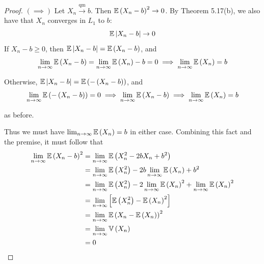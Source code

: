 \documentclass[a4paper]{article}
\begin{document}
\newpage

\begin{proof}[Proof] 
\(\left( \implies \right)\)  Let \(X_{n} \xrightarrow{\text{qm}} b\). Then \(\mathbb{E}\left( X_{n} - b \right)^{2} \rightarrow 0\). By Theorem 5.17(b), we also have that \(X_{n}\) converges in \(L_{1}\) to \(b\):
\[
	\mathbb{E}\left| X_{n} - b \right| \rightarrow 0
\]
If \(X_{n} - b \ge 0\), then \(\mathbb{E}\left|X_{n} - b \right| = \mathbb{E}\left( X_{n} - b \right)\), and 
\[
	\lim_{n \to \infty} \mathbb{E}\left( X_{n} - b \right) = \lim_{n \to \infty} \mathbb{E}\left( X_{n} \right) - b = 0 \implies \lim_{n \to \infty} \mathbb{E}\left( X_{n} \right) = b
\]

Otherwise, \(\mathbb{E}\left| X_{n} - b \right| = \mathbb{E}\left( -\left( X_{n} - b \right)  \right)\), and 
\[
	\lim_{n \to \infty} \mathbb{E}\left( - \left( X_{n} - b \right)  \right) = 0 \implies \lim_{n \to \infty} \mathbb{E}\left( X_{n} - b \right) \implies \lim_{n \to \infty} \mathbb{E}\left( X_{n} \right) = b
\] 

as before.

Thus we must have \(\lim_{n \to \infty}  \mathbb{E}\left( X_{n} \right) = b\) in either case. Combining this fact and the premise, it must follow that
\begin{align*}
	\lim_{n \to \infty} \mathbb{E}\left( X_{n} - b \right)^{2} & = \lim_{n \to \infty} \mathbb{E}\left( X^{2}_{n} - 2bX_{n} + b^{2} \right) \\
	& = \lim_{n \to \infty} \mathbb{E}\left( X^{2}_{n} \right) - 2b \lim_{n \to \infty} \mathbb{E}\left( X_{n} \right) + b^{2} \\
	& = \lim_{n \to \infty} \mathbb{E}\left( X^{2}_{n} \right) - 2 \lim_{n \to \infty} \mathbb{E}\left( X_{n} \right)^{2} + \lim_{n \to \infty} \mathbb{E}\left( X_{n} \right)^{2} \\
	& = \lim_{n \to \infty} \left[ \mathbb{E}\left( X^{2}_{n} \right) - \mathbb{E}\left( X_{n} \right)^{2} \right] \\
	& = \lim_{n \to \infty} \mathbb{E}\left( X_{n} - \mathbb{E}\left( X_{n} \right) \right)^{2} \\
	& = \lim_{n \to \infty} \mathbb{V}\left( X_{n} \right) \\
	& = 0
\end{align*}


\end{proof}
\end{document}
